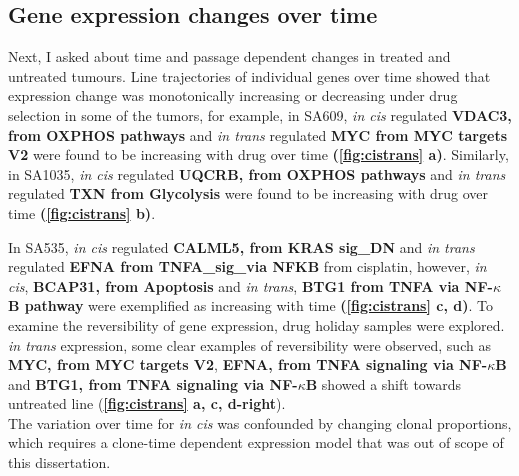 
\subsection{Gene expression changes over time}


Next, I asked  about time and passage dependent changes in treated and untreated tumours. Line trajectories of individual genes over time showed that expression change was monotonically increasing or decreasing under drug selection in some of the tumors, for example, in SA609, \textit{in cis} regulated \textbf{VDAC3, from OXPHOS pathways} and \textit{in trans} regulated \textbf{MYC from MYC targets V2} were found to be increasing with drug over time \textbf{(\autoref{fig:cistrans} a)}. 
Similarly, in SA1035, \textit{in cis} regulated \textbf{UQCRB, from OXPHOS pathways} and \textit{in trans} regulated \textbf{TXN from Glycolysis} were found to be increasing with drug over time \textbf{(\autoref{fig:cistrans} b)}. 

In SA535, \textit{in cis} regulated \textbf{CALML5, from KRAS sig\_DN} and \textit{in trans} regulated \textbf{EFNA from TNFA\_sig\_via NFKB} from cisplatin, however, \textit{in cis}, \textbf{BCAP31, from Apoptosis} and \textit{in trans}, \textbf{BTG1 from TNFA via NF-$\kappa$B pathway} were exemplified as increasing with time \textbf{(\autoref{fig:cistrans} c, d)}. 
To examine the reversibility of gene expression, drug holiday samples were explored. \textit{in trans} expression, some clear examples of reversibility were observed, such as \textbf{MYC, from MYC targets V2}, \textbf{EFNA, from TNFA signaling via NF-$\kappa$B} and \textbf{BTG1, from TNFA signaling via NF-$\kappa$B} showed a shift towards untreated line (\textbf{\autoref{fig:cistrans} a, c, d-right}). 
\\
The variation over time for \textit{in cis} was confounded by changing clonal proportions, which requires a clone-time dependent expression model that was out of scope of this dissertation.


